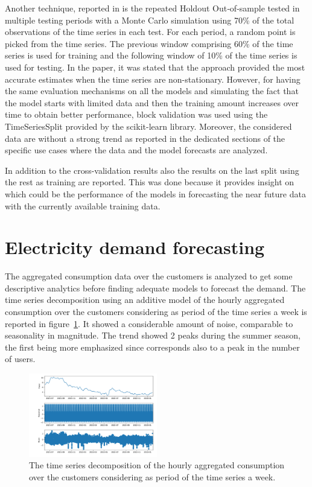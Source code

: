Another technique, reported in \cite{Cerqueira2020} is the repeated Holdout Out‐of‐sample tested in multiple testing periods with a Monte Carlo simulation using 70\% of the total observations of the time series in each test.
For each period, a random point is picked from the time series.
The previous window comprising 60\% of the time series is used for training and the following window of 10\% of the time series is used for testing.
In the paper, it was stated that the approach provided the most accurate estimates when the time series are non-stationary.
However, for having the same evaluation mechanisms on all the models and simulating the fact that the model starts with limited data and then the training amount increases over time to obtain better performance, block validation was used using the TimeSeriesSplit provided by the scikit-learn library.
Moreover, the considered data are without a strong trend as reported in the dedicated sections of the specific use cases where the data and the model forecasts are analyzed.

In addition to the cross-validation results also the results on the last split using the rest as training are reported.
This was done because it provides insight on which could be the performance of the models in forecasting the near future data with the currently available training data.


\section{Electricity demand forecasting}
\label{sec:demandval}
\vspace{0.2 cm}

The aggregated consumption data over the customers is analyzed to get some descriptive analytics before finding adequate models to forecast the demand.
The time series decomposition using an additive model of the hourly aggregated consumption over the customers considering as period of the time series a week is reported in figure~\ref{fig:demanddecomposition}.
It showed a considerable amount of noise, comparable to seasonality in magnitude.
The trend showed 2 peaks during the summer season, the first being more emphasized since corresponds also to a peak in the number of users.

\begin{figure}[H]
\centering
\includegraphics[width=0.5\textwidth]{images/demand/hourly_decomposition_week_period}
\caption{The time series decomposition of the hourly aggregated consumption over the customers considering as period of the time series a week.}
\label{fig:demanddecomposition}
\end{figure}

